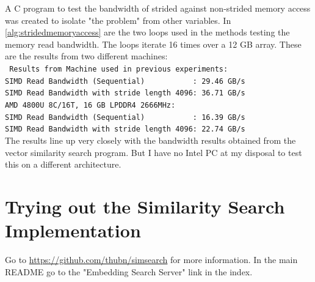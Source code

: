 \noindent A C program to test the bandwidth of strided against non-strided memory access was created to isolate "the problem" from other variables. In \autoref{alg:stridedmemoryaccess} are the two loops used in the methods testing the memory read bandwidth. The loops iterate 16 times over a 12 GB array. These are the results from two different machines:
\\\texttt{
  Results from Machine used in previous experiments:\\
  SIMD Read Bandwidth (Sequential)\ \ \ \ \ \ \ \ \ \ \ : 29.46 GB/s\\
  SIMD Read Bandwidth with stride length 4096: 36.71 GB/s\\
  AMD 4800U 8C/16T, 16 GB LPDDR4 2666MHz:\\
  SIMD Read Bandwidth (Sequential)\ \ \ \ \ \ \ \ \ \ \ : 16.39 GB/s\\
  SIMD Read Bandwidth with stride length 4096: 22.74 GB/s\\
}
The results line up very closely with the bandwidth results obtained from the vector similarity search program. But I have no Intel PC at my disposal to test this on a different architecture.

\section{Trying out the Similarity Search Implementation}
\label{sec:tryingout}
Go to \url{https://github.com/thubn/simsearch} for more information. In the main README go to the "Embedding Search Server" link in the index.

